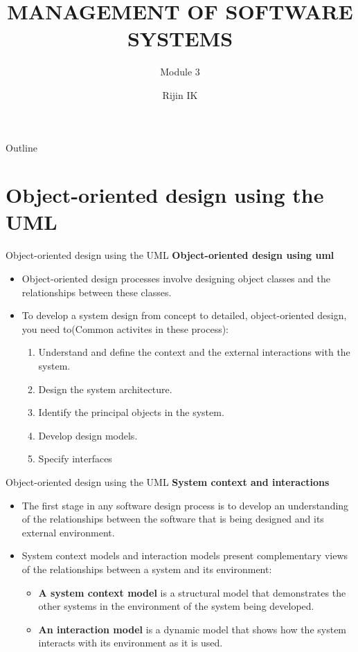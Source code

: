 \documentclass{beamer}
\title[CST 309 M3]{MANAGEMENT OF SOFTWARE SYSTEMS}
\subtitle{Module 3}
\author{Rijin IK}
\institute[VJEC]{Assistant Professor\\Department of Computer Science and Engineering\\Vimal Jyothi Engineering College\\Chemperi}
\begin{document}
	\begin{frame}
		\titlepage
	\end{frame}
   \begin{frame}{Outline}
   \tableofcontents
   \end{frame}
\section{Object-oriented design using the UML}
\begin{frame}{Object-oriented design using the UML}
\textbf{Object-oriented design using uml}
\begin{itemize}
	\item Object-oriented design processes involve designing object classes and the 
	relationships between these classes.
	\item To develop a system design from concept to detailed, object-oriented 
	design, you need to(Common activites in these process):
	\begin{enumerate}
		\item Understand and define the context and the external interactions with the system. 
		\item Design the system architecture. 
		\item Identify the principal objects in the system. 
		\item Develop design models. 
		\item Specify interfaces
	\end{enumerate}
\end{itemize}
\end{frame}
\begin{frame}{Object-oriented design using the UML}
	\textbf{System context and interactions}
	\begin{itemize}
		\item The first stage in any software design process is to develop an understanding of the 
		relationships between the software that is being designed and its external environment.
		\item System context models and interaction models present complementary views of the 
		relationships between a system and its environment:
		\begin{itemize}
			\item \textbf{A system context model} is a structural model that demonstrates the other systems 
				in the environment of the system being developed.
				\item \textbf{An interaction model} is a dynamic model that shows how the system interacts 
					with its environment as it is used.
		\end{itemize}
	\end{itemize}
\end{frame}
\end{document}
